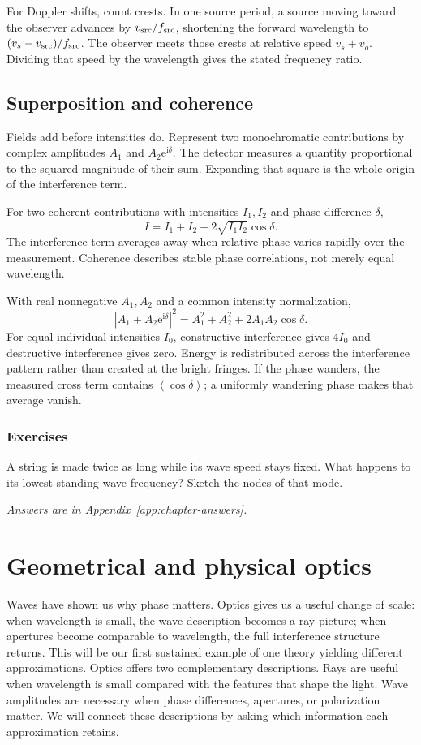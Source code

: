 \documentclass[11pt,oneside]{book}
\newcommand{\ii}{\mathrm{i}}
\newcommand{\ee}{\mathrm{e}}
\newcommand{\avg}[1]{\left\langle #1\right\rangle}
\theoremstyle{reviewstyle}
\newcommand{\learningcheck}[1]{\subsection*{Exercises}\noindent #1\par\smallskip\noindent\emph{Answers are in Appendix~\ref{app:chapter-answers}.}}
\begin{document}
For Doppler shifts, count crests. In one source period, a source moving toward the observer advances by $v_{\rm src}/f_{\rm src}$, shortening the forward wavelength to $(v_s-v_{\rm src})/f_{\rm src}$. The observer meets those crests at relative speed $v_s+v_o$. Dividing that speed by the wavelength gives the stated frequency ratio.

\section{Superposition and coherence}
Fields add before intensities do. Represent two monochromatic contributions by complex amplitudes $A_1$ and $A_2\ee^{\ii\delta}$. The detector measures a quantity proportional to the squared magnitude of their sum. Expanding that square is the whole origin of the interference term.

For two coherent contributions with intensities $I_1,I_2$ and phase difference $\delta$,
\begin{equation}I=I_1+I_2+2\sqrt{I_1I_2}\cos\delta.\end{equation}
The interference term averages away when relative phase varies rapidly over the measurement. Coherence describes stable phase correlations, not merely equal wavelength.

With real nonnegative $A_1,A_2$ and a common intensity normalization,
\begin{equation}
|A_1+A_2\ee^{\ii\delta}|^2=A_1^2+A_2^2+2A_1A_2\cos\delta.
\end{equation}
For equal individual intensities $I_0$, constructive interference gives $4I_0$ and destructive interference gives zero. Energy is redistributed across the interference pattern rather than created at the bright fringes. If the phase wanders, the measured cross term contains $\avg{\cos\delta}$; a uniformly wandering phase makes that average vanish.

\learningcheck{A string is made twice as long while its wave speed stays fixed. What happens to its lowest standing-wave frequency? Sketch the nodes of that mode.}

\chapter{Geometrical and physical optics}
Waves have shown us why phase matters. Optics gives us a useful change of scale: when wavelength is small, the wave description becomes a ray picture; when apertures become comparable to wavelength, the full interference structure returns. This will be our first sustained example of one theory yielding different approximations.
Optics offers two complementary descriptions. Rays are useful when wavelength is small compared with the features that shape the light. Wave amplitudes are necessary when phase differences, apertures, or polarization matter. We will connect these descriptions by asking which information each approximation retains.
\end{document}
